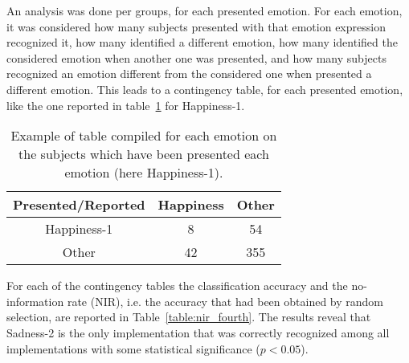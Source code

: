 An analysis was done per groups, for each presented emotion. For each emotion, it was considered how many subjects presented with that emotion expression recognized it, how many identified a different emotion, how many identified the considered emotion when  another one was presented, and how many subjects recognized an emotion different from the considered one when presented a different emotion. This leads to a contingency table, for each presented emotion, like the one reported in table~\ref{table:singleEmotion} for Happiness-1. 
\begin{table}[!htbp]
\begin{center}
\caption{Example of table compiled for each emotion on the subjects which have been presented each emotion (here Happiness-1).}
\label{table:singleEmotion}
\begin{tabular}{|c|c|c|}
\hline 
Presented/Reported&Happiness&Other\\
\hline 
Happiness-1&8&54\\
\hline 
Other&42&355\\
\hline
\end{tabular}
\end{center}
\end{table}

For each of the contingency tables the classification accuracy and the no-information rate (NIR), i.e. the accuracy that had been obtained by random selection, are reported in Table~\ref{table:nir_fourth}. The results reveal that Sadness-2 is the only implementation that was correctly recognized among all implementations with some statistical significance ($p<0.05$). 

